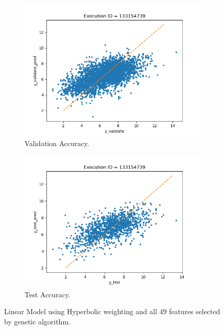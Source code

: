 \documentclass[11pt]{article}
\begin{document}

\begin{figure}
     \centering
     \begin{subfigure}[b]{0.45\textwidth}
         \centering
         \includegraphics[scale=0.45]{images/accuracyValidateLGHyperbolic}
         \caption{Validation Accuracy.}
        \label{fig:accuracyValidateLGHyperbolic}
     \end{subfigure}
     \hfill
     \begin{subfigure}[b]{0.45\textwidth}
         \centering
         \includegraphics[scale=0.45]{images/accuracytestLGHyperbolic}
        \caption{Test Accuracy.}
        \label{fig:accuracytestLGHyperbolic}
     \end{subfigure}
     \caption{Linear Model using Hyperbolic weighting and all 49 features selected by genetic algorithm.}
     \label{fig:BestLinearModel}
\end{figure}
\end{document}
